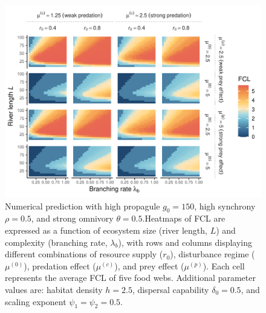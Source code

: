 \begin{figure}
\centering
\includegraphics{../data_fmt/fig_rho05_g150_theta05.pdf}
\caption{Numerical prediction with high propagule \(g_0 = 150\), high
synchrony \(\rho = 0.5\), and strong omnivory \(\theta = 0.5\).Heatmaps
of FCL are expressed as a function of ecosystem size (river length,
\(L\)) and complexity (branching rate, \(\lambda_b\)), with rows and
columns displaying different combinations of resource supply (\(r_0\)),
disturbance regime (\(\mu^{(0)}\)), predation effect (\(\mu^{(c)}\)),
and prey effect (\(\mu^{(p)}\)). Each cell represents the average FCL of
five food webs. Additional parameter values are: habitat density
\(h=2.5\), dispersal capability \(\delta_0=0.5\), and scaling exponent
\(\psi_1=\psi_2=0.5\).}
\end{figure}

\newpage

